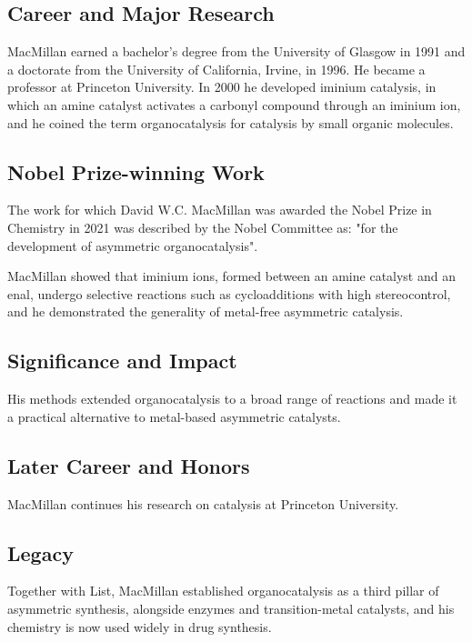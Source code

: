 \subsection*{Career and Major Research}

MacMillan earned a bachelor's degree from the University of Glasgow in 1991 and a doctorate from the University of California, Irvine, in 1996. He became a professor at Princeton University. In 2000 he developed iminium catalysis, in which an amine catalyst activates a carbonyl compound through an iminium ion, and he coined the term organocatalysis for catalysis by small organic molecules.

\subsection*{Nobel Prize-winning Work}

The work for which David W.C. MacMillan was awarded the Nobel Prize in Chemistry in 2021 was described by the Nobel Committee as: "for the development of asymmetric organocatalysis".

MacMillan showed that iminium ions, formed between an amine catalyst and an enal, undergo selective reactions such as cycloadditions with high stereocontrol, and he demonstrated the generality of metal-free asymmetric catalysis.

\subsection*{Significance and Impact}

His methods extended organocatalysis to a broad range of reactions and made it a practical alternative to metal-based asymmetric catalysts.

\subsection*{Later Career and Honors}

MacMillan continues his research on catalysis at Princeton University.

\subsection*{Legacy}

Together with List, MacMillan established organocatalysis as a third pillar of asymmetric synthesis, alongside enzymes and transition-metal catalysts, and his chemistry is now used widely in drug synthesis.

